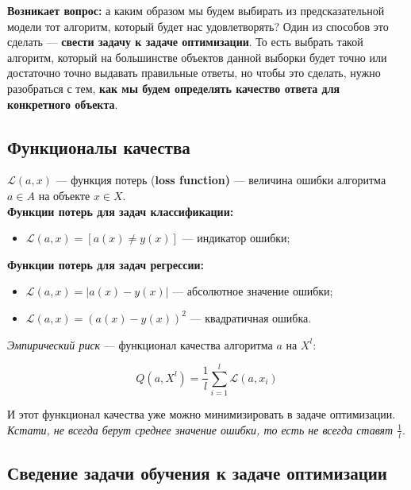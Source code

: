 \documentclass{article}
\begin{document}
\quad

\textbf{Возникает вопрос:} а каким образом мы будем выбирать из предсказательной модели тот алгоритм, который будет нас удовлетворять? Один из способов это сделать --- \textbf{свести задачу к задаче оптимизации}. То есть выбрать такой алгоритм, который на большинстве объектов данной выборки будет точно или достаточно точно выдавать правильные ответы, но чтобы это сделать, нужно разобраться с тем, \textbf{как мы будем определять качество ответа для конкретного объекта}.

\subsection{Функционалы качества}

$\mathscr{L}(a, x)$ --- функция потерь (\textbf{loss function)} --- величина ошибки алгоритма $a \in A$ на объекте $x \in X$.
\\

\textbf{Функции потерь для задач классификации:}
\begin{itemize}
\item $\mathscr{L}(a, x) = [a(x)\not=y(x)]$ --- индикатор ошибки;
\end{itemize}

\quad

\textbf{Функции потерь для задач регрессии:}
\begin{itemize}
\item $\mathscr{L}(a, x) = |a(x) - y(x)|$ --- абсолютное значение ошибки;
\item $\mathscr{L}(a, x) = (a(x) - y(x))^2$ --- квадратичная ошибка.
\end{itemize}

\quad

\textit{Эмпирический риск} --- функционал качества алгоритма $a$ на $X^l$:

$$Q(a, X^l) = \frac{1}{l}\sum\limits_{i = 1}^l \mathscr{L}(a, x_i)$$

И этот функционал качества уже можно минимизировать в задаче оптимизации.
\\

\textit{Кстати, не всегда берут среднее значение ошибки, то есть не всегда ставят $\frac{1}{l}$}.

\subsection{Сведение задачи обучения к задаче оптимизации}
\end{document}
